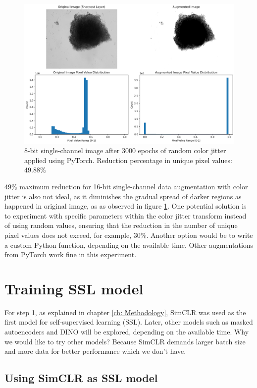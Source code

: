 \documentclass[12pt,twoside,a4paper,parskip]{scrbook} %
\begin{document}
\begin{figure}[H]
  \centering
  \includegraphics[scale=0.5]{figures/16bit_onen.png} 
  \caption{8-bit single-channel image after 3000 epochs of random color jitter applied using PyTorch. Reduction percentage in unique pixel values: 49.88\%}
  \label{fig:16bit_n one}
\end{figure}

$49\%$ maximum reduction for 16-bit single-channel data augmentation with color jitter is also not ideal, as it diminishes the gradual spread of darker regions as happened in original image, as  as observed in figure \ref{fig:16bit_n one}. One potential solution is to experiment with specific parameters within the color jitter transform instead of using random values, ensuring that the reduction in the number of unique pixel values does not exceed, for example, $30\%$. Another option would be to write a custom Python function, depending on the available time. Other augmentations from PyTorch work fine in this experiment.

\section{Training SSL model}

For step 1, as explained in chapter \ref{ch: Methodology}, SimCLR was used as the first model for self-supervised learning (SSL). Later, other models such as masked autoencoders and DINO will be explored, depending on the available time.
Why we would like to try other models? Because SimCLR demands larger batch size and more data for better performance which we don't have.



\subsection{Using SimCLR as SSL model}
\end{document}
